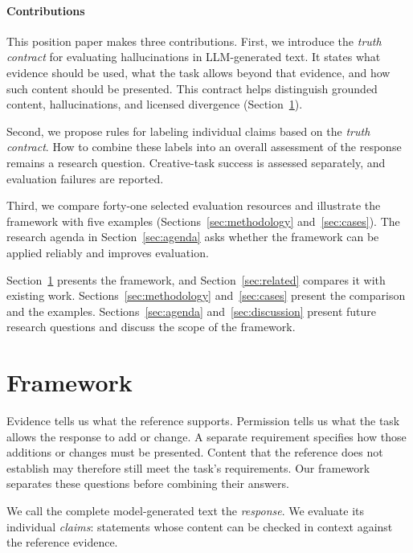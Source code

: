 \documentclass{clv2025}
\begin{document}
\paragraph{Contributions}
This position paper makes three contributions. First, we introduce the
\emph{truth contract} for evaluating hallucinations in LLM-generated text. It states what evidence should be used, what the task
allows beyond that evidence, and how such content should be presented. This
contract helps distinguish grounded content, hallucinations, and licensed
divergence (Section~\ref{sec:framework}).

Second, we propose rules for labeling individual claims based on the \emph{truth contract}.
How to combine these labels into an overall assessment of the response remains a research question. 
Creative-task success is assessed separately, and evaluation failures are reported.

Third, we compare forty-one selected evaluation resources and illustrate the
framework with five examples
(Sections~\ref{sec:methodology} and~\ref{sec:cases}). %
The research agenda in Section~\ref{sec:agenda} asks whether the framework can be applied reliably and improves evaluation.

Section~\ref{sec:framework} presents the framework, and
Section~\ref{sec:related} compares it with existing work.
Sections~\ref{sec:methodology} and~\ref{sec:cases} present the comparison and
the examples. Sections~\ref{sec:agenda} and~\ref{sec:discussion}
present future research questions and discuss the scope of the framework.

\section{Framework}\label{sec:framework}

Evidence tells us what the reference supports. Permission tells us what the
task allows the response to add or change. A separate requirement specifies
how those additions or changes must be presented. Content that the reference
does not establish may therefore still meet the task's requirements.
Our framework separates these questions before combining their answers.

We call the complete model-generated text the \emph{response}. We evaluate
its individual \emph{claims}: statements whose content can be checked in
context against the reference evidence.
\end{document}

